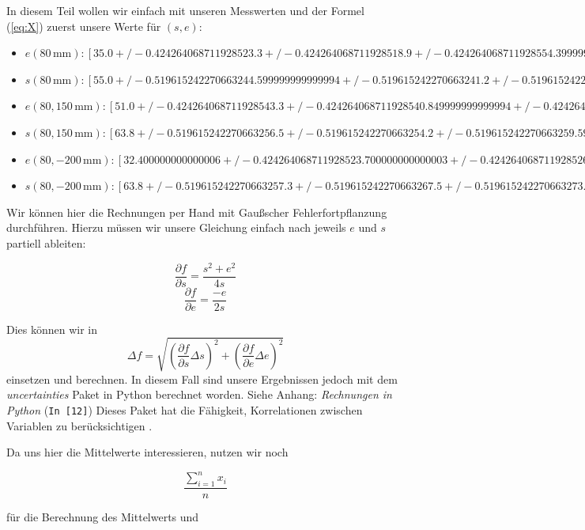 \documentclass[11pt,a4paper]{article}
\newcommand{\refpy}[1]{Siehe Anhang: \textit{Rechnungen in Python} (\texttt{{\color{incolor}In [{\color{incolor}#1}]}})}
\newcommand\mean{\begin{equation}
\frac{\sum_{i=1}^n x_{i}}{n}\label{mean}
\end{equation}}
\begin{document}
In diesem Teil wollen wir einfach mit unseren Messwerten und der Formel (\ref{eq:X}) zuerst unsere Werte f\"ur $(s,e)$:
\begin{itemize}
\item $e(80\,\mathrm{mm}):  [35.0+/-0.4242640687119285 23.3+/-0.4242640687119285
 18.9+/-0.4242640687119285 54.39999999999999+/-0.4242640687119285
 44.50000000000001+/-0.4242640687119285]$
\item $s(80\,\mathrm{mm}):  [55.0+/-0.5196152422706632 44.599999999999994+/-0.5196152422706632
 41.2+/-0.5196152422706632 73.2+/-0.5196152422706632
 63.8+/-0.5196152422706632]$
\item $e(80,150\,\mathrm{mm}):  [51.0+/-0.4242640687119285 43.3+/-0.4242640687119285
 40.849999999999994+/-0.4242640687119285 46.6+/-0.4242640687119285
 54.3+/-0.4242640687119285]$
\item $s(80,150\,\mathrm{mm}):  [63.8+/-0.5196152422706632 56.5+/-0.5196152422706632
 54.2+/-0.5196152422706632 59.599999999999994+/-0.5196152422706632
 67.1+/-0.5196152422706632]$
\item $e(80,-200\,\mathrm{mm}):  [32.400000000000006+/-0.4242640687119285
 23.700000000000003+/-0.4242640687119285
 26.799999999999997+/-0.4242640687119285
 43.49999999999999+/-0.4242640687119285 22.5+/-0.4242640687119285]$
\item $s(80,-200\,\mathrm{mm}):  [63.8+/-0.5196152422706632 57.3+/-0.5196152422706632
 67.5+/-0.5196152422706632 73.3+/-0.5196152422706632
 56.3+/-0.5196152422706632]$
\end{itemize}

Wir k\"onnen hier die Rechnungen per Hand mit Gau\ss scher Fehlerfortpflanzung durchf\"uhren. Hierzu m\"ussen wir unsere Gleichung einfach nach jeweils $e$ und $s$ partiell ableiten:

\[
\frac{\partial f}{\partial s}=\frac{s^2+e^2}{4s}
\]
\[
\frac{\partial f}{\partial e}=\frac{-e}{2s}
\]

Dies k\"onnen wir in
\[
\Delta f=\sqrt{\left(\frac{\partial f}{\partial s}\Delta s\right)^2+\left(\frac{\partial f}{\partial e}\Delta e\right)^2}
\]
einsetzen und berechnen. In diesem Fall sind unsere Ergebnissen jedoch mit dem \textit{uncertainties} Paket in Python berechnet worden. \refpy{12} Dieses Paket hat die F\"ahigkeit, Korrelationen zwischen Variablen zu ber\"ucksichtigen \cite{Uncertainties}.

Da uns hier die Mittelwerte interessieren, nutzen wir noch

\mean

f\"ur die Berechnung des Mittelwerts und
\end{document}
